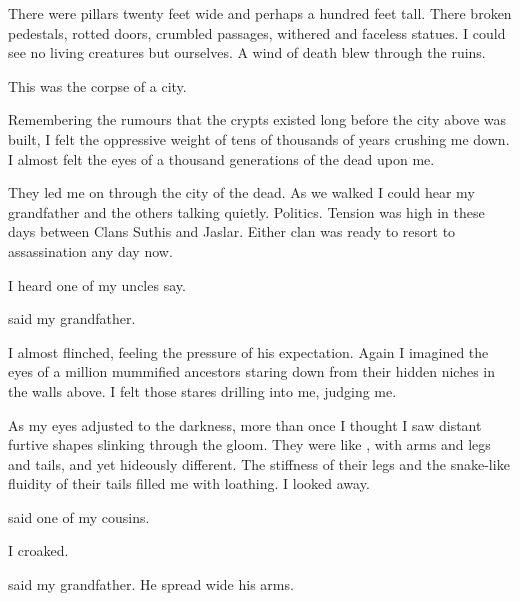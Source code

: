 \documentclass
  [a4paper,
   12pt,
   oneside
  ]%
  {article}
\begin{document}
There were pillars twenty feet wide and perhaps a hundred feet tall. 
There broken pedestals, rotted doors, crumbled passages, withered and faceless statues. 
I could see no living creatures but ourselves. 
A wind of death blew through the ruins. 

This was the corpse of a city. 

Remembering the rumours that the crypts existed long before the city above was built, I felt the oppressive weight of tens of thousands of years crushing me down. 
I almost felt the eyes of a thousand generations of the dead upon me.

They led me on through the city of the dead.
As we walked I could hear my grandfather and the others talking quietly. 
Politics.
Tension was high in these days between Clans Suthis and Jaslar. 
Either clan was ready to resort to assassination any day now. 

 I heard one of my uncles say.

 said my grandfather. 

I almost flinched, feeling the pressure of his expectation.
Again I imagined the eyes of a million mummified ancestors staring down from their hidden niches in the walls above. 
I felt those stares drilling into me, judging me. 

As my eyes adjusted to the darkness, more than once I thought I saw distant furtive shapes slinking through the gloom.
They were like \scathae, with arms and legs and tails, and yet hideously different.%
\index{\scatha}
The stiffness of their legs and the snake-like fluidity of their tails filled me with loathing.
I looked away. 

 said one of my cousins.

 I croaked. 

 said my grandfather.
\index{\Yormis}
He spread wide his arms.


\end{document}
